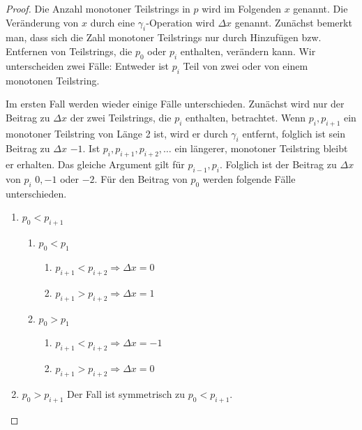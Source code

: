 \documentclass[a4paper, 10pt, ngerman]{article}
\begin{document}
\begin{proof}
    Die Anzahl monotoner Teilstrings in $p$ wird im Folgenden $x$ genannt. Die Veränderung von $x$ durch eine $\gamma_i$-Operation wird $\Delta x$ genannt. Zunächst bemerkt man, dass sich die Zahl monotoner Teilstrings nur durch Hinzufügen bzw. Entfernen von Teilstrings, die $p_0$ oder $p_i$ enthalten, verändern kann. Wir unterscheiden zwei Fälle: Entweder ist $p_i$ Teil von zwei oder von einem monotonen Teilstring.

    Im ersten Fall werden wieder einige Fälle unterschieden. Zunächst wird nur der Beitrag zu $\Delta x$ der zwei Teilstrings, die $p_i$ enthalten, betrachtet. Wenn $p_i, p_{i + 1}$ ein monotoner Teilstring von Länge 2 ist, wird er durch $\gamma_i$ entfernt, folglich ist sein Beitrag zu $\Delta x$ $-1$. Ist $p_i, p_{i + 1}, p_{i + 2}, \dots$ ein längerer, monotoner Teilstring bleibt er erhalten. Das gleiche Argument gilt für $p_{i - 1}, p_i$. Folglich ist der Beitrag zu $\Delta x$ von $p_i$ $0, -1$ oder $-2$.
    Für den Beitrag von $p_0$ werden folgende Fälle unterschieden.

    \begin{enumerate}
        \item $p_0 < p_{i + 1}$
              \begin{enumerate}
                  \item $p_0 < p_1$
                        \begin{enumerate}
                            \item $p_{i + 1} < p_{i + 2} \Longrightarrow \Delta x = 0$
                            \item $p_{i + 1} > p_{i + 2} \Longrightarrow \Delta x = 1$
                        \end{enumerate}
                  \item $p_0 > p_1$
                        \begin{enumerate}
                            \item $p_{i + 1} < p_{i + 2} \Longrightarrow \Delta x = -1$
                            \item $p_{i + 1} > p_{i + 2} \Longrightarrow \Delta x = 0$
                        \end{enumerate}
              \end{enumerate}
        \item $p_0 > p_{i + 1}$ Der Fall ist symmetrisch zu $p_0 < p_{i + 1}$.
    \end{enumerate}


\end{proof}
\end{document}

